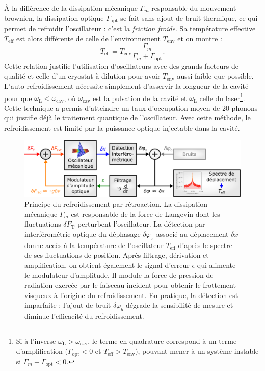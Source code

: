 \documentclass[12pt,a4paper]{article}
\begin{document}
À la différence de la dissipation mécanique $\Gamma_m$ responsable du mouvement brownien, la dissipation optique $\Gamma_\mathrm{opt}$ se fait sans ajout de bruit thermique, ce qui permet de refroidir l'oscillateur : c'est la \textit{friction froide}.
Sa température effective $T_\mathrm{eff}$ est alors différente de celle de l'environnement $T_\mathrm{env}$ et on montre :
\begin{equation}
T_\mathrm{eff} = T_\mathrm{env} \frac{\Gamma_m}{\Gamma_m+\Gamma_\mathrm{opt}}.
\end{equation}
Cette relation justifie l'utilisation d'oscillateurs avec des grands facteurs de qualité et celle d'un cryostat à dilution pour avoir $T_\mathrm{env}$ aussi faible que possible.
L'auto-refroidissement nécessite \og simplement \fg{} d'asservir la longueur de la cavité pour que $\omega_\mathrm{L} < \omega_\mathrm{cav}$, où $\omega_\mathrm{cav}$ est la pulsation de la cavité et $\omega_\mathrm{L}$ celle du laser\footnote{Si à l'inverse $\omega_\mathrm{L} > \omega_\mathrm{cav}$, le terme en quadrature correspond à un terme d'amplification ($\Gamma_\mathrm{opt} < 0 $ et $T_\mathrm{eff} > T_\mathrm{env}$), pouvant mener à un système instable si $\Gamma_m + \Gamma_\mathrm{opt} < 0$.}.
Cette technique a permis d'atteindre un taux d'occupation moyen de 20 phonons qui justifie déjà le traitement quantique de l'oscillateur.
Avec cette méthode, le refroidissement est limité par la puissance optique injectable dans la cavité.

\begin{figure}
\center
\includegraphics[scale=0.6]{figures/feedback_cooling_v3_small.png}
\caption{Principe du refroidissement par rétroaction.
La dissipation mécanique $\Gamma_m$ est responsable de la force de Langevin dont les fluctuations $\delta F_\mathrm{T}$ perturbent l'oscillateur.
La détection par interférométrie optique du déphasage $\delta \varphi_x$ associé au déplacement $\delta x$ donne accès à la température de l'oscillateur $T_\mathrm{eff}$ d'après le spectre de ses fluctuations de position.
Après filtrage, dérivation et amplification, on obtient également le signal d'erreur $\epsilon$ qui alimente le modulateur d'amplitude.
Il module la force de pression de radiation exercée par le faisceau incident pour obtenir le frottement visqueux à l'origine du refroidissement.
En pratique, la détection est imparfaite : l'ajout de bruit $\delta \varphi_b$ dégrade la sensibilité de mesure et diminue l'efficacité du refroidissement.}
\label{fig:feedback_scheme}
\end{figure}
\end{document}
